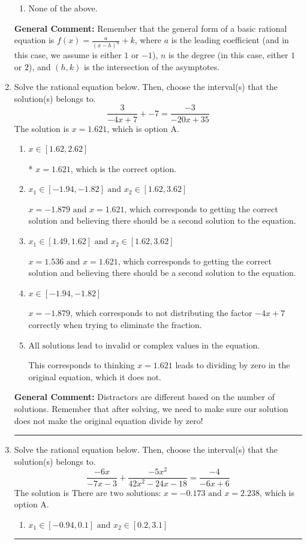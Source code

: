\documentclass{extbook}[14pt]
\newcommand{\litem}[1]{\item #1

\rule{\textwidth}{0.4pt}}
\begin{document}
\begin{enumerate}
{\begin{enumerate}[label=\Alph*.]
\begin{multicols}{2}
\end{multicols}\item None of the above.\end{enumerate}
\textbf{General Comment:} Remember that the general form of a basic rational equation is $ f(x) = \frac{a}{(x-h)^n} + k$, where $a$ is the leading coefficient (and in this case, we assume is either $1$ or $-1$), $n$ is the degree (in this case, either $1$ or $2$), and $(h, k)$ is the intersection of the asymptotes.
}
\litem{
Solve the rational equation below. Then, choose the interval(s) that the solution(s) belongs to.
\[ \frac{3}{-4x + 7} + -7 = \frac{-3}{-20x + 35} \]The solution is \( x = 1.621 \), which is option A.\begin{enumerate}[label=\Alph*.]
\item \( x \in [1.62,2.62] \)

* $x = 1.621$, which is the correct option.
\item \( x_1 \in [-1.94, -1.82] \text{ and } x_2 \in [1.62,3.62] \)

$x = -1.879 \text{ and } x = 1.621$, which corresponds to getting the correct solution and believing there should be a second solution to the equation.
\item \( x_1 \in [1.49, 1.62] \text{ and } x_2 \in [1.62,3.62] \)

$x = 1.536 \text{ and } x = 1.621$, which corresponds to getting the correct solution and believing there should be a second solution to the equation.
\item \( x \in [-1.94,-1.82] \)

$x = -1.879$, which corresponds to not distributing the factor $-4x + 7$ correctly when trying to eliminate the fraction.
\item \( \text{All solutions lead to invalid or complex values in the equation.} \)

This corresponds to thinking $x = 1.621$ leads to dividing by zero in the original equation, which it does not.
\end{enumerate}

\textbf{General Comment:} Distractors are different based on the number of solutions. Remember that after solving, we need to make sure our solution does not make the original equation divide by zero!
}
\litem{
Solve the rational equation below. Then, choose the interval(s) that the solution(s) belongs to.
\[ \frac{-6x}{-7x -3} + \frac{-5x^{2}}{42x^{2} -24 x -18} = \frac{-4}{-6x + 6} \]The solution is \( \text{There are two solutions: } x = -0.173 \text{ and } x = 2.238 \), which is option A.\begin{enumerate}[label=\Alph*.]
\item \( x_1 \in [-0.94, 0.1] \text{ and } x_2 \in [0.2,3.1] \)


\end{enumerate}}
\end{enumerate}
\end{document}
